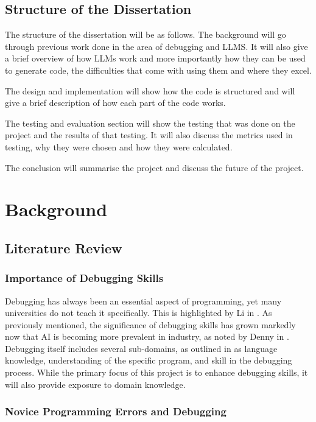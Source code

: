 \documentclass[12pt]{extarticle}
\begin{document}
\subsection{Structure of the Dissertation}

The structure of the dissertation will be as follows. The background will go through previous work done in the area of debugging and LLMS. It will also give a brief overview of how LLMs work and more importantly how they can be used to generate code, the difficulties that come with using them and where they excel. 

The design and implementation will show how the code is structured and will give a brief description of how each part of the code works.

The testing and evaluation section will show the testing that was done on the project and the results of that testing. It will also discuss the metrics used in testing, why they were chosen and how they were calculated.

The conclusion will summarise the project and discuss the future of the project.
\newpage
\section{Background}

\subsection{Literature Review}

\subsubsection{Importance of Debugging Skills}

Debugging has always been an essential aspect of programming, yet many universities do not teach it specifically. This is highlighted by Li in \cite{li2019}. As previously mentioned, the significance of debugging skills has grown markedly now that AI is becoming more prevalent in industry, as noted by Denny in \cite{denny2024}. Debugging itself includes several sub-domains, as outlined in \cite{li2019} as language knowledge, understanding of the specific program, and skill in the debugging process. While the primary focus of this project is to enhance debugging skills, it will also provide exposure to domain knowledge.

\subsubsection{Novice Programming Errors and Debugging}
\end{document}
